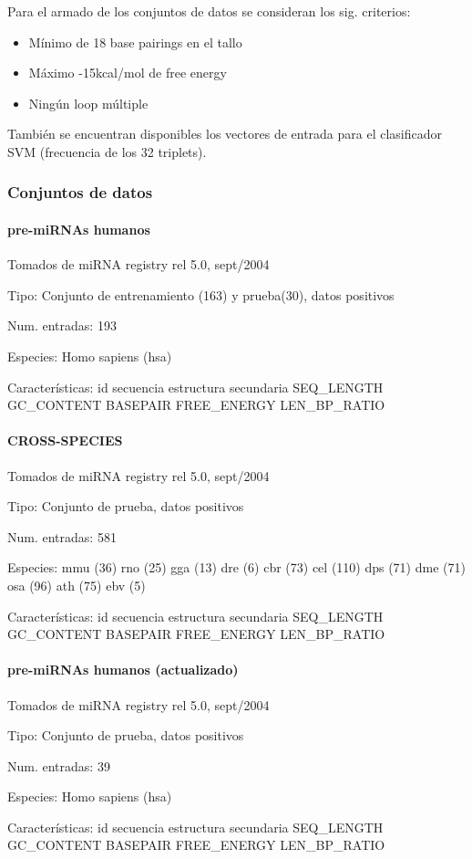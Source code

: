 \documentclass[12pt,bibliography=openstyle,DIV=12,parskip=half-]{scrartcl}
\begin{document}
Para el armado de los conjuntos de datos se consideran los
sig. criterios:
\begin{itemize}
\item Mínimo de 18 base pairings en el tallo
\item Máximo -15kcal/mol de free energy
\item Ningún loop múltiple
\end{itemize}

También se encuentran disponibles los vectores de entrada para el
clasificador SVM (frecuencia de los 32 triplets).
%
\subsubsection{Conjuntos de datos}
\paragraph{pre-miRNAs humanos}
Tomados de miRNA registry rel 5.0, sept/2004
\begin{description*}
\item[Tipo:] Conjunto de entrenamiento (163) y prueba(30), datos
  positivos
\item[Num. entradas:] 193
\item[Especies:] Homo sapiens (hsa)
\item[Características:] id \quad secuencia \quad estructura secundaria
  \quad SEQ\_LENGTH \quad GC\_CONTENT \quad BASEPAIR \quad
  FREE\_ENERGY \quad LEN\_BP\_RATIO
\end{description*}
\paragraph{CROSS-SPECIES}
Tomados de miRNA registry rel 5.0, sept/2004
\begin{description*}
\item[Tipo:] Conjunto de prueba, datos positivos
\item[Num. entradas:] 581
\item[Especies:]
\quad mmu (36)
\quad rno (25)
\quad gga (13)
\quad dre (6)
\quad cbr (73)
\quad cel (110)
\quad dps (71)
\quad dme (71)
\quad osa (96)
\quad ath (75)
\quad ebv (5)
\item[Características:]
id \quad
secuencia \quad
estructura secundaria \quad
SEQ\_LENGTH \quad
GC\_CONTENT \quad
BASEPAIR \quad
FREE\_ENERGY \quad
LEN\_BP\_RATIO
\end{description*}
%
\paragraph{pre-miRNAs humanos (actualizado)}
Tomados de miRNA registry rel 5.0, sept/2004
\begin{description*}
\item[Tipo:] Conjunto de prueba, datos positivos
\item[Num. entradas:] 39
\item[Especies:]  Homo sapiens (hsa)
\item[Características:]id \quad
secuencia \quad
estructura secundaria \quad
SEQ\_LENGTH \quad
GC\_CONTENT \quad
BASEPAIR \quad
FREE\_ENERGY \quad
LEN\_BP\_RATIO
\end{description*}
%
\end{document}
